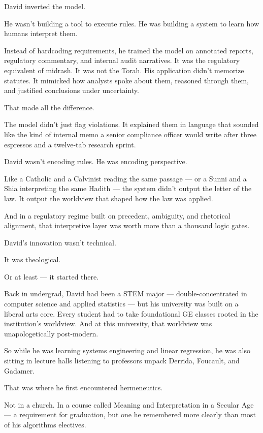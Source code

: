 David inverted the model.

He wasn’t building a tool to execute rules. He was building a system to learn how humans interpret them.

Instead of hardcoding requirements, he trained the model on annotated reports, regulatory commentary, and internal audit narratives.
It was the regulatory equivalent of midrash. It was not the Torah.
His application didn’t memorize statutes. 
It mimicked how analysts spoke about them, reasoned through them, and justified conclusions under uncertainty.

That made all the difference.

The model didn’t just flag violations. 
It explained them in language that sounded like the kind of internal memo a senior compliance officer would write after three espressos and a twelve-tab research sprint.

David wasn’t encoding rules. He was encoding perspective.

Like a Catholic and a Calvinist reading the same passage 
--- or a Sunni and a Shia interpreting the same Hadith --- 
the system didn’t output the letter of the law. 
It output the worldview that shaped how the law was applied.

And in a regulatory regime built on precedent, ambiguity, and rhetorical alignment,
that interpretive layer was worth more than a thousand logic gates.

David’s innovation wasn’t technical.

It was theological.

Or at least — it started there.

\medskip

Back in undergrad, David had been a STEM major — double-concentrated in computer science and applied statistics —
but his university was built on a liberal arts core. Every student had to take foundational GE classes rooted in the institution’s worldview.
And at this university, that worldview was unapologetically post-modern.

So while he was learning systems engineering and linear regression,
he was also sitting in lecture halls listening to professors unpack Derrida, Foucault, and Gadamer.

That was where he first encountered hermeneutics.

Not in a church.
In a course called Meaning and Interpretation in a Secular Age — a requirement for graduation, but one he remembered more clearly than most of his algorithms electives.

